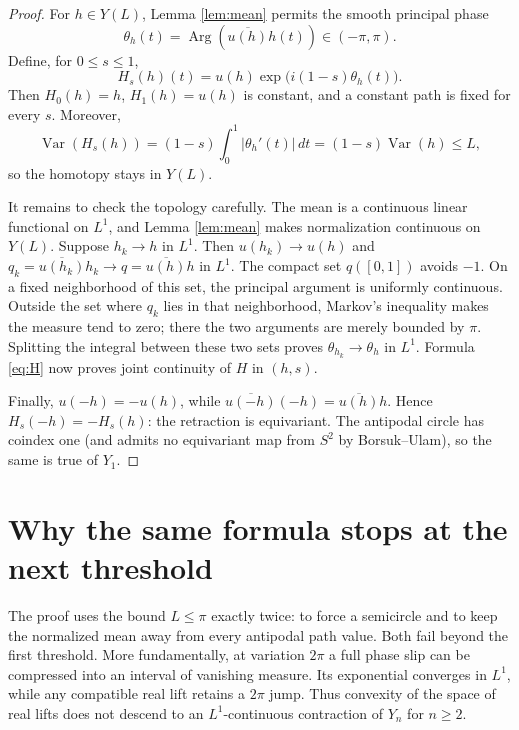 \documentclass[10pt,a4paper]{article}
\newcommand{\Var}{\operatorname{Var}}
\newcommand{\Arg}{\operatorname{Arg}}
\begin{document}
\begin{proof}
For \(h\in Y(L)\), Lemma \ref{lem:mean} permits the smooth principal phase
\[
 \theta_h(t)=\Arg\!\left(\overline{u(h)}h(t)\right)\in(-\pi,\pi).
\]
Define, for \(0\leq s\leq1\),
\begin{equation}\label{eq:H}
 H_s(h)(t)=u(h)\exp\!\big(i(1-s)\theta_h(t)\big).
\end{equation}
Then \(H_0(h)=h\), \(H_1(h)=u(h)\) is constant, and a constant path is fixed
for every \(s\).  Moreover,
\[
 \Var(H_s(h))=(1-s)\int_0^1|\theta_h'(t)|\,dt
             =(1-s)\Var(h)\leq L,
\]
so the homotopy stays in \(Y(L)\).

It remains to check the topology carefully.  The mean is a continuous linear
functional on \(L^1\), and Lemma \ref{lem:mean} makes normalization continuous
on \(Y(L)\).  Suppose \(h_k\to h\) in \(L^1\).  Then
\(u(h_k)\to u(h)\) and
\(q_k=\overline{u(h_k)}h_k\to q=\overline{u(h)}h\) in \(L^1\).
The compact set \(q([0,1])\) avoids \(-1\).  On a fixed neighborhood of this
set, the principal argument is uniformly continuous.  Outside the set where
\(q_k\) lies in that neighborhood, Markov's inequality makes the measure tend
to zero; there the two arguments are merely bounded by \(\pi\).  Splitting the
integral between these two sets proves
\(\theta_{h_k}\to\theta_h\) in \(L^1\).  Formula \eqref{eq:H} now proves joint
continuity of \(H\) in \((h,s)\).

Finally, \(u(-h)=-u(h)\), while
\(\overline{u(-h)}(-h)=\overline{u(h)}h\).  Hence
\(H_s(-h)=-H_s(h)\): the retraction is equivariant.  The antipodal circle has
coindex one (and admits no equivariant map from \(S^2\) by Borsuk--Ulam), so
the same is true of \(Y_1\).
\end{proof}

\section{Why the same formula stops at the next threshold}

The proof uses the bound \(L\leq\pi\) exactly twice: to force a semicircle and
to keep the normalized mean away from every antipodal path value.  Both fail
beyond the first threshold.  More fundamentally, at variation \(2\pi\) a
full phase slip can be compressed into an interval of vanishing measure.  Its
exponential converges in \(L^1\), while any compatible real lift retains a
\(2\pi\) jump.  Thus convexity of the space of real lifts does not descend to
an \(L^1\)-continuous contraction of \(Y_n\) for \(n\geq2\).
\end{document}
